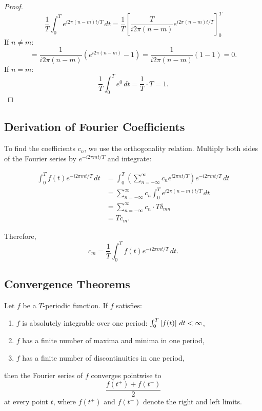 \begin{notechapter}
\begin{proof}
\[
\frac{1}{T}\int_0^T e^{i 2\pi (n-m) t/T} \, dt = \frac{1}{T} \left[ \frac{T}{i 2\pi (n-m)} e^{i 2\pi (n-m) t/T} \right]_0^T
\]
If $n \neq m$:
\[
= \frac{1}{i 2\pi (n-m)} \left( e^{i 2\pi (n-m)} - 1 \right) = \frac{1}{i 2\pi (n-m)} (1 - 1) = 0.
\]
If $n = m$:
\[
\frac{1}{T}\int_0^T e^{0} \, dt = \frac{1}{T} \cdot T = 1.
\]
\end{proof}

\subsection{Derivation of Fourier Coefficients}

To find the coefficients $c_n$, we use the orthogonality relation. Multiply both sides of the Fourier series by $e^{-i 2\pi m t/T}$ and integrate:

\begin{align*}
\int_0^T f(t) e^{-i 2\pi m t/T} \, dt &= \int_0^T \left( \sum_{n=-\infty}^{\infty} c_n e^{i 2\pi n t/T} \right) e^{-i 2\pi m t/T} \, dt \\
&= \sum_{n=-\infty}^{\infty} c_n \int_0^T e^{i 2\pi (n-m) t/T} \, dt \\
&= \sum_{n=-\infty}^{\infty} c_n \cdot T \delta_{mn} \\
&= T c_m.
\end{align*}

Therefore,
\[
c_m = \frac{1}{T} \int_0^T f(t) e^{-i 2\pi m t/T} \, dt.
\]

\subsection{Convergence Theorems}

\begin{theorem}
Let $f$ be a $T$-periodic function. If $f$ satisfies:
\begin{enumerate}
\item $f$ is absolutely integrable over one period: $\int_0^T \left|f(t)\right| \, dt < \infty$,
\item $f$ has a finite number of maxima and minima in one period,
\item $f$ has a finite number of discontinuities in one period,
\end{enumerate}
then the Fourier series of $f$ converges pointwise to
\[
\frac{f(t^+) + f(t^-)}{2}
\]
at every point $t$, where $f(t^+)$ and $f(t^-)$ denote the right and left limits.
\end{theorem}


\end{notechapter}
